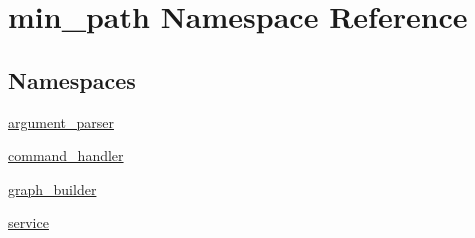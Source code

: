 \hypertarget{namespacemin__path}{}\section{min\+\_\+path Namespace Reference}
\label{namespacemin__path}
\subsection*{Namespaces}
\begin{DoxyCompactItemize}
\item 
 \hyperlink{namespacemin__path_1_1argument__parser}{argument\+\_\+parser}
\item 
 \hyperlink{namespacemin__path_1_1command__handler}{command\+\_\+handler}
\item 
 \hyperlink{namespacemin__path_1_1graph__builder}{graph\+\_\+builder}
\item 
 \hyperlink{namespacemin__path_1_1service}{service}
\end{DoxyCompactItemize}
